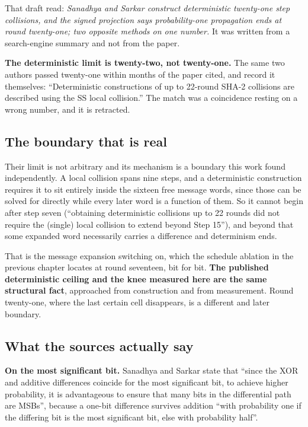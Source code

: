 That draft read: \emph{Sanadhya and Sarkar construct deterministic twenty-one step collisions, and
the signed projection says probability-one propagation ends at round twenty-one; two opposite
methods on one number.} It was written from a search-engine summary and not from the paper.

\textbf{The deterministic limit is twenty-two, not twenty-one.} The same two authors passed
twenty-one within months of the paper cited, and record it themselves: ``Deterministic constructions
of up to 22-round SHA-2 collisions are described using the SS local collision.'' The match was a
coincidence resting on a wrong number, and it is retracted.

\subsection{The boundary that is real}

Their limit is not arbitrary and its mechanism is a boundary this work found independently. A local
collision spans nine steps, and a deterministic construction requires it to sit entirely inside the
sixteen free message words, since those can be solved for directly while every later word is a
function of them. So it cannot begin after step seven (``obtaining deterministic collisions up to
22 rounds did not require the (single) local collision to extend beyond Step 15''), and beyond
that some expanded word necessarily carries a difference and determinism ends.

That is the message expansion switching on, which the schedule ablation in the previous chapter
locates at round seventeen, bit for bit. \textbf{The published deterministic ceiling and the knee
measured here are the same structural fact}, approached from construction and from measurement.
Round twenty-one, where the last certain cell disappears, is a different and later boundary.

\subsection{What the sources actually say}

\textbf{On the most significant bit.} Sanadhya and Sarkar state that ``since the XOR and additive
differences coincide for the most significant bit, to achieve higher probability, it is advantageous
to ensure that many bits in the differential path are MSBs'', because a one-bit difference survives
addition ``with probability one if the differing bit is the most significant bit, else with
probability half''.

